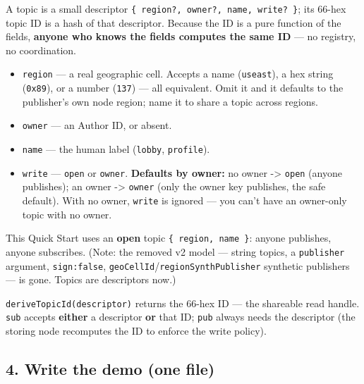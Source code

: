 \documentclass[
  nobib]{tufte-handout}
\providecommand{\tightlist}{%
  \setlength{\itemsep}{0pt}\setlength{\parskip}{0pt}}
\begin{document}
A topic is a small descriptor
\texttt{\{\ region?,\ owner?,\ name,\ write?\ \}}; its 66-hex topic ID
is a hash of that descriptor. Because the ID is a pure function of the
fields, \textbf{anyone who knows the fields computes the same ID} --- no
registry, no coordination.

\begin{itemize}
\tightlist
\item
  \texttt{region} --- a real geographic cell. Accepts a name
  (\texttt{\textquotesingle{}useast\textquotesingle{}}), a hex string
  (\texttt{\textquotesingle{}0x89\textquotesingle{}}), or a number
  (\texttt{137}) --- all equivalent. Omit it and it defaults to the
  publisher's own node region; name it to share a topic across regions.
\item
  \texttt{owner} --- an Author ID, or absent.
\item
  \texttt{name} --- the human label
  (\texttt{\textquotesingle{}lobby\textquotesingle{}},
  \texttt{\textquotesingle{}profile\textquotesingle{}}).
\item
  \texttt{write} --- \texttt{\textquotesingle{}open\textquotesingle{}}
  or \texttt{\textquotesingle{}owner\textquotesingle{}}.
  \textbf{Defaults by owner:} no owner -\textgreater{}
  \texttt{\textquotesingle{}open\textquotesingle{}} (anyone publishes);
  an owner -\textgreater{}
  \texttt{\textquotesingle{}owner\textquotesingle{}} (only the owner key
  publishes, the safe default). With no owner, \texttt{write} is ignored
  --- you can't have an owner-only topic with no owner.
\end{itemize}

This Quick Start uses an \textbf{open} topic
\texttt{\{\ region,\ name\ \}}: anyone publishes, anyone subscribes.
(Note: the removed v2 model --- string topics, a \texttt{publisher}
argument, \texttt{sign:false},
\texttt{geoCellId}/\texttt{regionSynthPublisher} synthetic publishers
--- is gone. Topics are descriptors now.)

\texttt{deriveTopicId(descriptor)} returns the 66-hex ID --- the
shareable read handle. \texttt{sub} accepts \textbf{either} a descriptor
\textbf{or} that ID; \texttt{pub} always needs the descriptor (the
storing node recomputes the ID to enforce the write policy).

\subsection{4. Write the demo (one file)}\label{write-the-demo-one-file}
\end{document}

